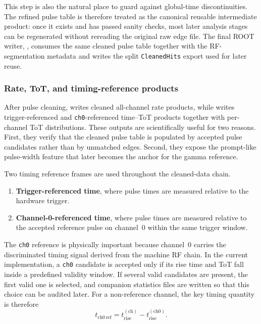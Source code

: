 This step is also the natural place to guard against global-time discontinuities. The refined pulse table is therefore treated as the canonical reusable intermediate product: once it exists and has passed sanity checks, most later analysis stages can be regenerated without rereading the original raw edge file. The final ROOT writer, , consumes the same cleaned pulse table together with the RF-segmentation metadata and writes the split \texttt{CleanedHits} export used for later reuse.

\subsubsection{Rate, ToT, and timing-reference products}

After pulse cleaning,  writes cleaned all-channel rate products, while  writes trigger-referenced and \texttt{ch0}-referenced time--ToT products together with per-channel ToT distributions. These outputs are scientifically useful for two reasons. First, they verify that the cleaned pulse table is populated by accepted pulse candidates rather than by unmatched edges. Second, they expose the prompt-like pulse-width feature that later becomes the anchor for the gamma reference.

Two timing reference frames are used throughout the cleaned-data chain.

\begin{enumerate}
\item \textbf{Trigger-referenced time}, where pulse times are measured relative to the hardware trigger.
\item \textbf{Channel-0-referenced time}, where pulse times are measured relative to the accepted reference pulse on channel~0 within the same trigger window.
\end{enumerate}

The \texttt{ch0} reference is physically important because channel~0 carries the discriminated timing signal derived from the machine RF chain. In the current implementation, a \texttt{ch0} candidate is accepted only if its rise time and ToT fall inside a predefined validity window. If several valid candidates are present, the first valid one is selected, and companion statistics files are written so that this choice can be audited later. For a non-reference channel, the key timing quantity is therefore
\begin{equation}
t_{\mathrm{ch0\,ref}} = t_{\mathrm{rise}}^{(\mathrm{ch})} - t_{\mathrm{rise}}^{(\mathrm{ch0})}.
\end{equation}

